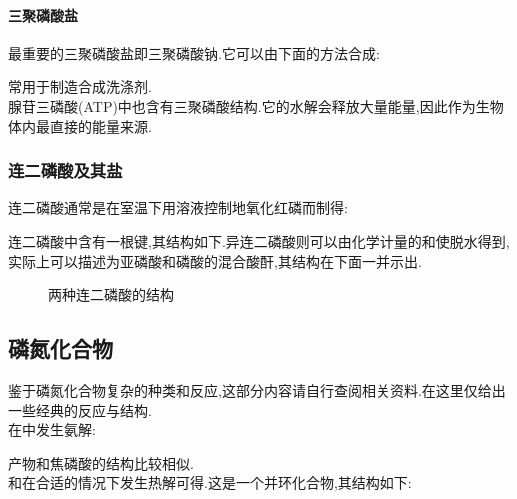 \documentclass{ctexart}
\begin{document}
\paragraph{三聚磷酸盐}
最重要的三聚磷酸盐即三聚磷酸钠.它可以由下面的方法合成:
\begin{center}
\end{center}
常用于制造合成洗涤剂.\\
\indent 腺苷三磷酸(ATP)中也含有三聚磷酸结构.它的水解会释放大量能量,因此作为生物体内最直接的能量来源.
\subsubsection{连二磷酸及其盐}
连二磷酸通常是在室温下用溶液控制地氧化红磷而制得:
\begin{center}
\end{center}
连二磷酸中含有一根键,其结构如下.异连二磷酸则可以由化学计量的和使脱水得到,%
实际上可以描述为亚磷酸和磷酸的混合酸酐,其结构在下面一并示出.
\begin{figure}[H]
    \centering
    \caption{两种连二磷酸的结构}
\end{figure}
\subsection{磷氮化合物}
鉴于磷氮化合物复杂的种类和反应,这部分内容请自行查阅相关资料.在这里仅给出一些经典的反应与结构.\\
\indent {}在中发生氨解:
\begin{center}
\end{center}
产物和焦磷酸的结构比较相似.\\
\indent {}和在合适的情况下发生热解可得.这是一个并环化合物,其结构如下:
\end{document}
